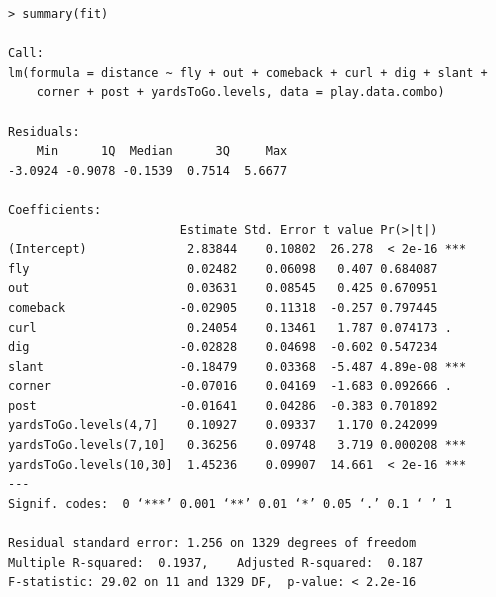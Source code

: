 \documentclass[12pt,letterpaper]{article}
\begin{document}
\begin{lstlisting}[frame=single]
> summary(fit)

Call:
lm(formula = distance ~ fly + out + comeback + curl + dig + slant + 
    corner + post + yardsToGo.levels, data = play.data.combo)

Residuals:
    Min      1Q  Median      3Q     Max 
-3.0924 -0.9078 -0.1539  0.7514  5.6677 

Coefficients:
                        Estimate Std. Error t value Pr(>|t|)    
(Intercept)              2.83844    0.10802  26.278  < 2e-16 ***
fly                      0.02482    0.06098   0.407 0.684087    
out                      0.03631    0.08545   0.425 0.670951    
comeback                -0.02905    0.11318  -0.257 0.797445    
curl                     0.24054    0.13461   1.787 0.074173 .  
dig                     -0.02828    0.04698  -0.602 0.547234    
slant                   -0.18479    0.03368  -5.487 4.89e-08 ***
corner                  -0.07016    0.04169  -1.683 0.092666 .  
post                    -0.01641    0.04286  -0.383 0.701892    
yardsToGo.levels(4,7]    0.10927    0.09337   1.170 0.242099    
yardsToGo.levels(7,10]   0.36256    0.09748   3.719 0.000208 ***
yardsToGo.levels(10,30]  1.45236    0.09907  14.661  < 2e-16 ***
---
Signif. codes:  0 ‘***’ 0.001 ‘**’ 0.01 ‘*’ 0.05 ‘.’ 0.1 ‘ ’ 1

Residual standard error: 1.256 on 1329 degrees of freedom
Multiple R-squared:  0.1937,	Adjusted R-squared:  0.187 
F-statistic: 29.02 on 11 and 1329 DF,  p-value: < 2.2e-16
\end{lstlisting}
\end{document}
